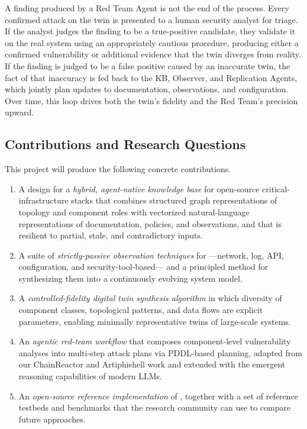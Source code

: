 A finding produced by a Red Team Agent is not the end of the process.
Every confirmed attack on the twin is presented to a human security
analyst for triage. If the analyst judges the finding to be a
true-positive candidate, they validate it on the real system using an
appropriately cautious procedure, producing either a confirmed
vulnerability or additional evidence that the twin diverges from
reality. If the finding is judged to be a false positive caused by an
inaccurate twin, the fact of that inaccuracy is fed back to the KB,
Observer, and Replication Agents, which jointly plan updates to
documentation, observations, and configuration. Over time, this loop
drives both the twin's fidelity and the Red Team's precision upward.

\subsection{Contributions and Research Questions}
\label{sec:intro-contribs}

This project will produce the following concrete contributions.

\begin{enumerate}[leftmargin=1.5em,itemsep=0.15em,topsep=0.3em]
  \item A design for a \emph{hybrid, agent-native knowledge base} for
  open-source critical-infrastructure stacks that combines structured
  graph representations of topology and component roles with vectorized
  natural-language representations of documentation, policies, and
  observations, and that is resilient to partial, stale, and
  contradictory inputs.

  \item A suite of \emph{strictly-passive observation techniques} for
  \CPSs---network, log, API, configuration, and security-tool-based---
  and a principled method for synthesizing them into a continuously
  evolving system model.

  \item A \emph{controlled-fidelity digital twin synthesis algorithm}
  in which diversity of component classes, topological patterns, and
  data flows are explicit parameters, enabling minimally representative
  twins of large-scale systems.

  \item An \emph{agentic red-team workflow} that composes component-level
  vulnerability analyses into multi-step attack plans via PDDL-based
  planning, adapted from our ChainReactor and Artiphishell work and
  extended with the emergent reasoning capabilities of modern LLMs.

  \item An \emph{open-source reference implementation} of \sysname,
  together with a set of reference \cps testbeds and benchmarks that
  the research community can use to compare future approaches.
\end{enumerate}

